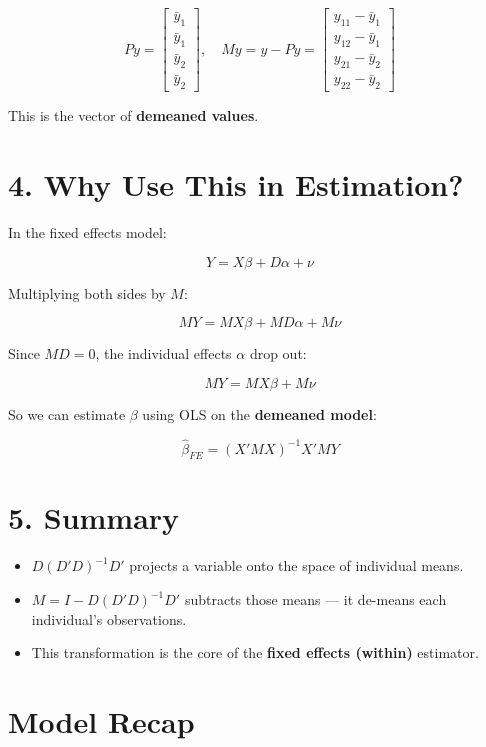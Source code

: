 \documentclass[12pt, oneside]{article}
\begin{document}
\[
Py = \begin{bmatrix}
\bar{y}_1 \\
\bar{y}_1 \\
\bar{y}_2 \\
\bar{y}_2
\end{bmatrix}, \quad
My = y - Py = \begin{bmatrix}
y_{11} - \bar{y}_1 \\
y_{12} - \bar{y}_1 \\
y_{21} - \bar{y}_2 \\
y_{22} - \bar{y}_2
\end{bmatrix}
\]

This is the vector of \textbf{demeaned values}.

\section*{4. Why Use This in Estimation?}

In the fixed effects model:

\[
Y = X \beta + D \alpha + \nu
\]

Multiplying both sides by \( M \):

\[
MY = MX \beta + MD \alpha + M \nu
\]

Since \( MD = 0 \), the individual effects \( \alpha \) drop out:

\[
MY = MX \beta + M \nu
\]

So we can estimate \( \beta \) using OLS on the \textbf{demeaned model}:

\[
\hat{\beta}_{FE} = (X'MX)^{-1}X'MY
\]

\section*{5. Summary}

\begin{itemize}
    \item \( D(D'D)^{-1}D' \) projects a variable onto the space of individual means.
    \item \( M = I - D(D'D)^{-1}D' \) subtracts those means — it de-means each individual's observations.
    \item This transformation is the core of the \textbf{fixed effects (within)} estimator.
\end{itemize}

\section*{Model Recap}
\end{document}
